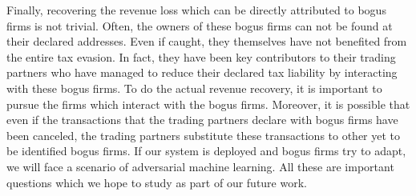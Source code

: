 Finally, recovering the revenue loss which can be directly attributed to bogus firms is not trivial. Often, the owners of these bogus firms can not be found at their declared addresses. Even if caught, they themselves have not benefited from the entire tax evasion. In fact, they have been key contributors to their trading partners who have managed to reduce their declared tax liability by interacting with these bogus firms. To do the actual revenue recovery, it is important to pursue the firms which interact with the bogus firms. Moreover, it is possible that even if the transactions that the trading partners declare with bogus firms have been canceled, the trading partners substitute these transactions to other yet to be identified bogus firms. If our system is deployed and bogus firms try to adapt, we will face a scenario of adversarial machine learning. All these are important questions which we hope to study as part of our future work.


%
%
